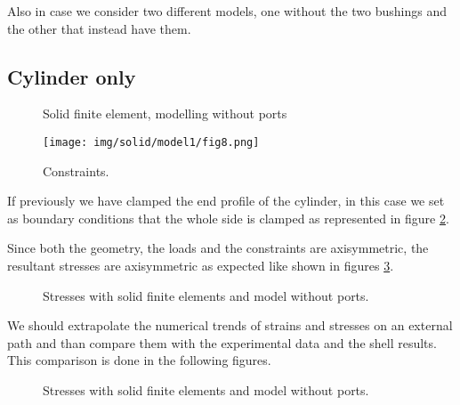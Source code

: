 \documentclass[a4paper,12pt]{article}
\begin{document}
Also in case we consider two different models, one without the two bushings and the other that instead have them.

\subsection{Cylinder only}

\begin{figure}[h]
\centering     %
\caption{Solid finite element, modelling without ports}
\label{fig:solidmodel1_loads}
\end{figure}

\begin{figure}[H]
\centering
\texttt{[image: img/solid/model1/fig8.png]}
\caption{Constraints.}
\label{fig:solidmodel1_constraints}
\end{figure}

If previously we have clamped the end profile of the cylinder, in this case we set as boundary conditions that the whole side is clamped as represented in figure \ref{fig:solidmodel1_constraints}.

Since both the geometry, the loads and the constraints are axisymmetric, the resultant stresses are axisymmetric as expected like shown in figures \ref{fig:solidmodel1_abqstresses}.

\begin{figure}[H]
\centering     %
\caption{Stresses with solid finite elements and model without ports.}
\label{fig:solidmodel1_abqstresses}
\end{figure}

We should extrapolate the numerical trends of strains and stresses on an external path and than compare them with the experimental data and the shell results. This comparison is done in the following figures.


\begin{figure}[H]
\centering     %
\caption{Stresses with solid finite elements and model without ports.}
\label{fig:solidmodel1_stress_top_noports}
\end{figure}
\end{document}
